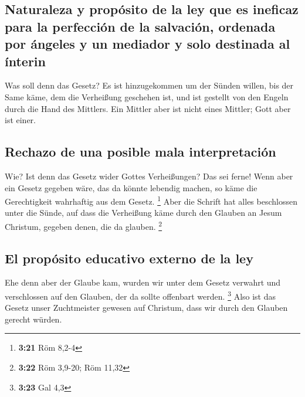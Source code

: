 \hypertarget{naturaleza-y-propuxf3sito-de-la-ley-que-es-ineficaz-para-la-perfecciuxf3n-de-la-salvaciuxf3n-ordenada-por-uxe1ngeles-y-un-mediador-y-solo-destinada-al-uxednterin}{%
\subsection{Naturaleza y propósito de la ley que es ineficaz para la
perfección de la salvación, ordenada por ángeles y un mediador y solo
destinada al
ínterin}\label{naturaleza-y-propuxf3sito-de-la-ley-que-es-ineficaz-para-la-perfecciuxf3n-de-la-salvaciuxf3n-ordenada-por-uxe1ngeles-y-un-mediador-y-solo-destinada-al-uxednterin}}

 Was soll denn das Gesetz? Es ist hinzugekommen um der
Sünden willen, bis der Same käme, dem die Verheißung geschehen ist, und
ist gestellt von den Engeln durch die Hand des Mittlers. 
Ein Mittler aber ist nicht eines Mittler; Gott aber ist einer.

\hypertarget{rechazo-de-una-posible-mala-interpretaciuxf3n}{%
\subsection{Rechazo de una posible mala
interpretación}\label{rechazo-de-una-posible-mala-interpretaciuxf3n}}

 Wie? Ist denn das Gesetz wider Gottes Verheißungen? Das
sei ferne! Wenn aber ein Gesetz gegeben wäre, das da könnte lebendig
machen, so käme die Gerechtigkeit wahrhaftig aus dem Gesetz. \footnote{\textbf{3:21}
  Röm 8,2-4}  Aber die Schrift hat alles beschlossen
unter die Sünde, auf dass die Verheißung käme durch den Glauben an Jesum
Christum, gegeben denen, die da glauben. \footnote{\textbf{3:22} Röm
  3,9-20; Röm 11,32}

\hypertarget{el-propuxf3sito-educativo-externo-de-la-ley}{%
\subsection{El propósito educativo externo de la
ley}\label{el-propuxf3sito-educativo-externo-de-la-ley}}

 Ehe denn aber der Glaube kam, wurden wir unter dem
Gesetz verwahrt und verschlossen auf den Glauben, der da sollte
offenbart werden. \footnote{\textbf{3:23} Gal 4,3}  Also
ist das Gesetz unser Zuchtmeister gewesen auf Christum, dass wir durch
den Glauben gerecht würden.

